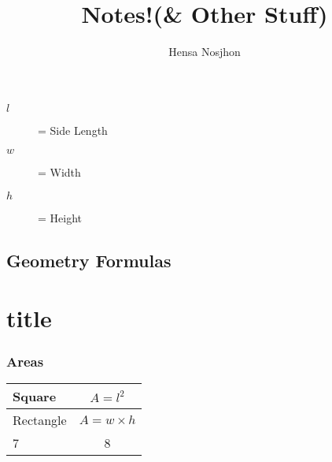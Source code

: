 \documentclass[12pt]{report}
\title{\Huge Notes!\normalsize (\& Other Stuff)}
\author{Hensa Nosjhon}
\date{}
\begin{document}
\maketitle
\begin{description}
\item [$l$] = Side Length
\item [$w$] = Width
\item [$h$] = Height
\end{description}

\chapter{Geometry Formulas}
\part{title}\section{Areas}
\begin{center}
	\begin{tabular}{ | l | c |}
		\hline
		Square & $A=l^2$\\ \hline
		Rectangle & $A=w\times h$\\ \hline
		7 & 8\\
		\hline
	\end{tabular}
\end{center}
\end{document}
